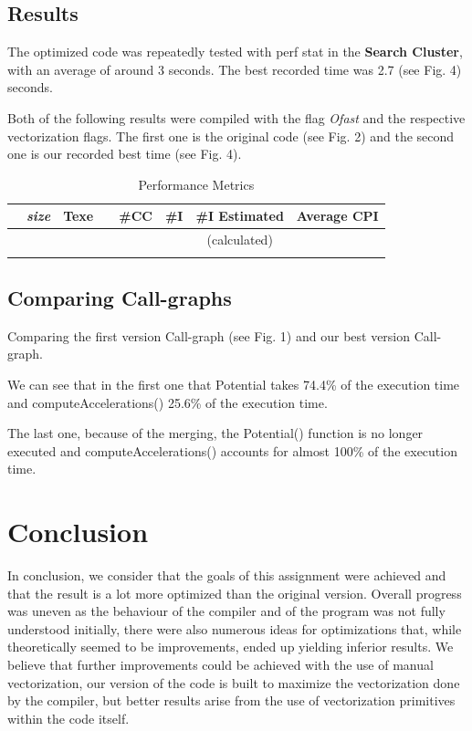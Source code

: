 \documentclass[conference]{IEEEtran}
\begin{document}
\subsection{Results}
The optimized code was repeatedly tested with perf stat in the \textbf{Search Cluster}, with an average of around 3 seconds. The best recorded time was 2.7 (see Fig. 4) seconds.

Both of the following results were compiled with the flag \textit{Ofast} and the respective vectorization flags. The first one is the original code (see Fig. 2) and the second one is our recorded best time (see Fig. 4).

\begin{table}[htbp]
\caption{Performance Metrics}
\begin{center}
\begin{tabular}{|c|c|c|c|c|c|c|}
\hline
{} 
 & \textbf{\textit{size}}& Texe & & #CC & #I & #I Estimated & Average CPI \\
\hline
 & & & & & &(calculated)&\\
\hline
 & & & & & & &\\
\hline
\end{tabular}
\label{tab1}
\end{center}
\end{table}


\subsection{Comparing Call-graphs}

Comparing the first version Call-graph (see Fig. 1) and our best version Call-graph.

We can see that in the first one that Potential takes 74.4\% of the execution time and computeAccelerations() 25.6\% of the execution time.

The last one, because of the merging, the Potential() function is no longer executed and computeAccelerations() accounts for almost 100\% of the execution time.

\section{Conclusion}

In conclusion, we consider that the goals of this assignment were achieved and that the result is a lot more optimized than the original version. Overall progress was uneven as the behaviour of the compiler and of the program was not fully understood initially, there were also numerous ideas for optimizations that, while theoretically seemed to be improvements, ended up yielding inferior results.
We believe that further improvements could be achieved with the use of manual vectorization, our version of the code is built to maximize the vectorization done by the compiler, but better results arise from the use of vectorization primitives within the code itself.
\end{document}
